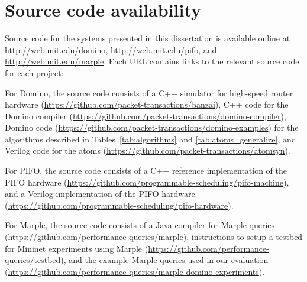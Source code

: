 \section{Source code availability}
Source code for the systems presented in this dissertation is available online
at \url{http://web.mit.edu/domino}, \url{http://web.mit.edu/pifo}, and
\url{http://web.mit.edu/marple}. Each URL contains links to the relevant source code for each project:
\begin{CompactEnumerate}
\item For Domino, the source code consists of a C++ simulator for high-speed router hardware (\url{https://github.com/packet-transactions/banzai}), C++ code for the Domino compiler (\url{https://github.com/packet-transactions/domino-compiler}), Domino code (\url{https://github.com/packet-transactions/domino-examples}) for the algorithms described in Tables~\ref{tab:algorithms} and \ref{tab:atoms_generalize}, and Verilog code for the atoms (\url{https://github.com/packet-transactions/atomsyn}).
\item For PIFO, the source code consists of a C++ reference implementation of the PIFO hardware (\url{https://github.com/programmable-scheduling/pifo-machine}), and a Verilog implementation of the PIFO hardware (\url{https://github.com/programmable-scheduling/pifo-hardware}).
\item For Marple, the source code consists of a Java compiler for Marple queries (\url{https://github.com/performance-queries/marple}), instructions to setup a testbed for Mininet experiments using Marple (\url{https://github.com/performance-queries/testbed}), and the example Marple queries used in our evaluation (\url{https://github.com/performance-queries/marple-domino-experiments}).
\end{CompactEnumerate}


